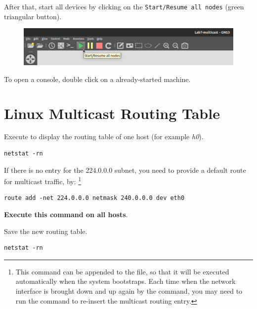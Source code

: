 \documentclass{../UTNetLab}
\begin{document}
After that, start all devices by clicking on the \texttt{Start/Resume all nodes} (green triangular button).
\begin{figure}[H]
    \centering
    \includegraphics[scale=1.6]{img/start-all}
\end{figure}

To open a console, double click on a already-started machine.


\section{Linux Multicast Routing Table}
\label{sec:linux-multicast-routing}
Execute  to display the routing table of one host (for example \textit{h0}).

\begin{lstlisting}
netstat -rn
\end{lstlisting}

If there is no entry for the 224.0.0.0 subnet, you need to provide a default route for multicast traffic, by:
\footnote{This command can be appended to the  file, so that it will be executed automatically when the system bootstraps.
    Each time when the network interface is brought down and up again by the  command, you may need to run the  command to re-insert the multicast routing entry.}

\begin{lstlisting}[emph=eth0,morekeywords={[3]add,netmask,dev}]
route add -net 224.0.0.0 netmask 240.0.0.0 dev eth0
\end{lstlisting}
\textbf{Execute this command on all hosts}.

Save the new routing table.

\begin{lstlisting}
netstat -rn
\end{lstlisting}
\end{document}
